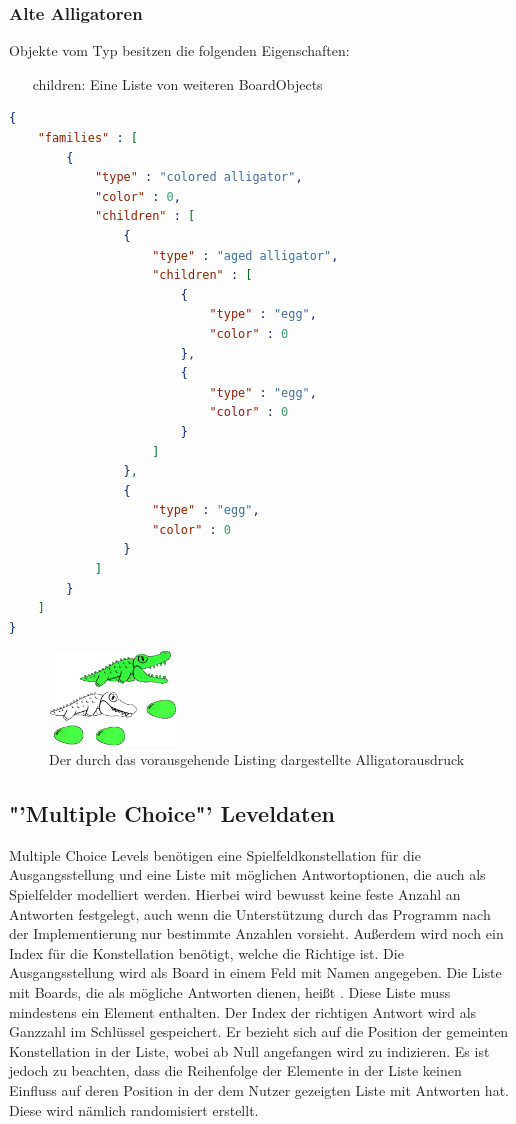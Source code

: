 \subsubsection{Alte Alligatoren}
Objekte vom Typ  besitzen die folgenden Eigenschaften:
\begin{itemize}
	\item[children:] Eine Liste von weiteren BoardObjects
\end{itemize}

\begin{lstlisting}[language=json,caption={Ein einfaches Board mit allen existierenden BoardObjects}]
{
	"families" : [
		{
			"type" : "colored alligator",
			"color" : 0,
			"children" : [
				{
					"type" : "aged alligator",
					"children" : [
						{
							"type" : "egg",
							"color" : 0
						},
						{
							"type" : "egg",
							"color" : 0
						}
					]
				},
				{
					"type" : "egg",
					"color" : 0
				}
			]
		}
	]
}
\end{lstlisting}
	
\begin{figure}[h]
	\caption{Der durch das vorausgehende Listing dargestellte Alligatorausdruck}
	\begin{center}
		\includegraphics[width=0.3\textwidth]{../assets/lx.((x x) x).png}
	\end{center}
\end{figure}

\subsection{"'Multiple Choice"' Leveldaten}
Multiple Choice Levels benötigen eine Spielfeldkonstellation für die Ausgangsstellung und eine Liste mit möglichen Antwortoptionen, die auch als Spielfelder modelliert werden.
Hierbei wird bewusst keine feste Anzahl an Antworten festgelegt, auch wenn die Unterstützung durch das Programm nach der Implementierung nur bestimmte Anzahlen vorsieht.
Außerdem wird noch ein Index für die Konstellation benötigt, welche die Richtige ist.
Die Ausgangsstellung wird als Board in einem Feld mit Namen  angegeben.
Die Liste mit Boards, die als mögliche Antworten dienen, heißt .
Diese Liste muss mindestens ein Element enthalten.
Der Index der richtigen Antwort wird als Ganzzahl im Schlüssel  gespeichert.
Er bezieht sich auf die Position der gemeinten Konstellation in der  Liste, wobei ab Null angefangen wird zu indizieren.
Es ist jedoch zu beachten, dass die Reihenfolge der Elemente in der Liste keinen Einfluss auf deren Position in der dem Nutzer gezeigten Liste mit Antworten hat.
Diese wird nämlich randomisiert erstellt.

